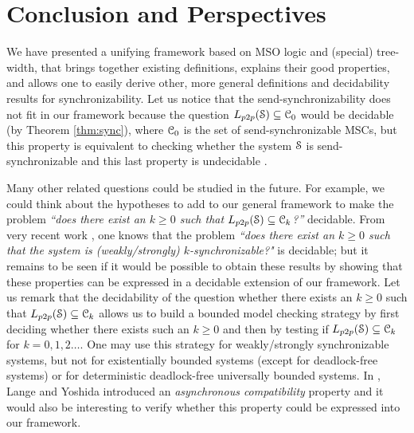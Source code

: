 \documentclass[a4paper,UKenglish,cleveref, autoref, thm-restate]{lipics-v2021}
\begin{document}
\section{Conclusion and Perspectives}
We have presented a unifying framework based on MSO logic and (special) tree-width, that brings together existing definitions, explains their good properties, and allows one to easily derive other, more general definitions and decidability results for synchronizability.
%
Let us notice that the send-synchronizability does not fit in our framework because the question $\ppL{\Sys} \subseteq \Class_0$ would be decidable (by Theorem \ref{thm:sync}), where $\mathcal{C}_0$ is the set of send-synchronizable MSCs, but this property is equivalent to checking whether the system $\mathcal{S}$ is send-synchronizable and this last property is undecidable \cite{DBLP:conf/icalp/FinkelL17}.

Many other related questions could be studied in the future. For example, we could think about the hypotheses to add to our general framework to make the problem \emph{``does there exist an $k \geq 0$ such that $\ppL{\Sys} \subseteq \Class_k$?''}  decidable. From very recent work \cite{DLL2021}, one knows that the problem \emph{``does there exist an $k \geq 0$ such that the system is (weakly/strongly) $k$-synchronizable?"} is decidable; but it remains to be seen if it would be possible to obtain these results by showing that these properties can be expressed in a decidable extension of our framework. Let us remark that the decidability of the question whether there exists an $k \geq 0$ such that $\ppL{\Sys} \subseteq \Class_k$ allows us to build a bounded model checking strategy by first deciding whether there exists such an $k \geq 0$ and then by testing if $\ppL{\Sys} \subseteq \Class_k$ for $k=0,1,2 \dots$.
One may use this strategy for weakly/strongly synchronizable systems, but not for existentially bounded systems (except for deadlock-free systems) or for deterministic deadlock-free universally bounded systems. %
 In \cite{DBLP:journals/corr/abs-1901-09606}, Lange and Yoshida introduced an \emph{asynchronous compatibility} property and it would also be interesting to verify whether this property could be expressed into our framework.







\clearpage
\appendix
\end{document}
